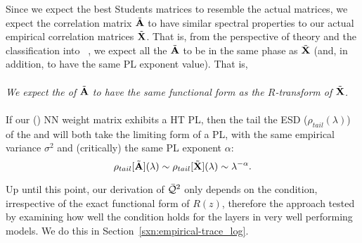 
Since we expect the best Students matrices to resemble the actual \Teacher matrices, we expect the \Student correlation matrix $\tilde{\mathbf{A}}$ to have similar spectral properties to our actual empirical correlation matrices $\tilde{\mathbf{X}}$.
That is, from the perspective of \HTSR theory and the classification into \PhasesOfTraining~\cite{MM18_TR_JMLRversion}, we expect all the $\tilde{\mathbf{A}}$ to be in the same phase as $\tilde{\mathbf{X}}$ (and, in addition, to have the same PL exponent value).   That is, 
\\
\\
\emph{We expect the \RTransform of $\tilde{\mathbf{A}}$ to have the same functional form as the $R$-transform of $\tilde{\mathbf{X}}$.}
\\
\\
If our (\Teacher) NN weight matrix exhibits a HT PL, then the tail the ESD ($\rho_{tail}(\lambda)$) of the \Student and \Teacher will both take the limiting form of a PL, with the same empirical variance $\sigma^{2}$ and (critically) the same PL exponent $\alpha$:
\begin{equation}
\label{eqn:R_PL}
  \rho_{tail}[\tilde{\mathbf{A}}](\lambda)\sim\rho_{tail}[\tilde{\mathbf{X}}](\lambda)\sim\lambda^{-\alpha}.
\end{equation}

Up until this point, our derivation of $\bar{\mathcal{Q}}^{2}$ only depends on the \TRACELOG condition, irrespective of the exact functional form of $R(z)$,
therefore the \SETOL approach tested by examining how well the \TRACELOG condition holds for the layers in very well performing models.
We do this in Section~\ref{sxn:empirical-trace_log}.





